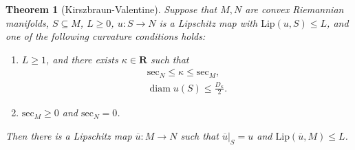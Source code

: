 \documentclass[reqno,11pt]{amsart}
\newcommand{\RR}{\mathbf{R}}
\newcommand{\Sec}{\mathrm{sec}}
\newcommand{\diam}{\operatorname{diam}}
\newcommand{\Lip}{\mathrm{Lip}}
\newtheorem{theorem}{Theorem}[section]
\theoremstyle{definition}
\numberwithin{equation}{section}
\begin{document}
\begin{theorem}[Kirszbraun-Valentine]
Suppose that $M, N$ are convex Riemannian manifolds, $S \subseteq M$, $L \geq 0$, $u: S \to N$ is a Lipschitz map with $\Lip(u, S) \leq L$, and one of the following curvature conditions holds:
\begin{enumerate}
\item $L \geq 1$, and there exists $\kappa \in \RR$ such that
\begin{align}
\Sec_N \leq \kappa \leq \Sec_M, \label{KV 1} \\
\diam u(S) \leq \frac{D_\kappa}{2}. \label{KV 2}
\end{align}
\item $\Sec_M \geq 0$ and $\Sec_N = 0$.
\end{enumerate}
Then there is a Lipschitz map $\overline u: M \to N$ such that $\overline u|_S = u$ and $\Lip(\overline u, M) \leq L$.
\end{theorem}
\end{document}
